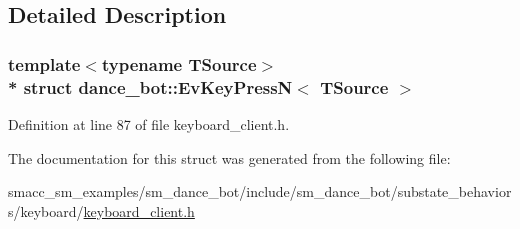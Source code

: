 \subsection{Detailed Description}
\subsubsection*{template$<$typename T\+Source$>$\\*
struct dance\+\_\+bot\+::\+Ev\+Key\+Press\+N$<$ T\+Source $>$}



Definition at line 87 of file keyboard\+\_\+client.\+h.



The documentation for this struct was generated from the following file\+:\begin{DoxyCompactItemize}
\item 
smacc\+\_\+sm\+\_\+examples/sm\+\_\+dance\+\_\+bot/include/sm\+\_\+dance\+\_\+bot/substate\+\_\+behaviors/keyboard/\hyperlink{keyboard__client_8h}{keyboard\+\_\+client.\+h}\end{DoxyCompactItemize}
